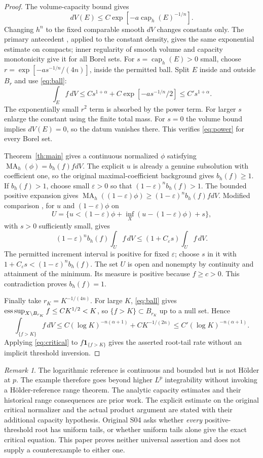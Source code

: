 \documentclass[11pt]{article}
\newcommand{\MA}{\operatorname{MA}}
\newcommand{\capH}{\operatorname{cap}}
\theoremstyle{remark}\newtheorem{remark}[theorem]{Remark}
\begin{document}
\begin{proof}
The volume-capacity bound \cite[Proposition 5.1]{KN} gives
\[
 dV(E)\leq C\exp[-a\capH_h(E)^{-1/n}].
\]
Changing $h^n$ to the fixed comparable smooth $dV$ changes constants
only. The primary antecedent \cite[Corollary 2.4]{DK}, applied to the
constant density, gives the same exponential estimate on compacts;
inner regularity of smooth volume and capacity monotonicity give it
for all Borel sets. For $s=\capH_h(E)>0$ small, choose
$r=\exp[-a s^{-1/n}/(4n)]$, inside the permitted ball.
Split $E$ inside and outside $B_r$ and use \eqref{eq:ball}:
\[
 \int_Ef\,dV\leq C s^{1+\alpha}
                +C\exp[-a s^{-1/n}/2]
          \leq C' s^{1+\alpha}.
\]
The exponentially small $r^2$ term is absorbed by the power term.
For larger $s$ enlarge the constant using the finite total mass.
For $s=0$ the volume bound implies $dV(E)=0$, so the datum vanishes
there. This verifies \eqref{eq:power} for every Borel set.

Theorem~\ref{th:main} gives a continuous normalized $\phi$ satisfying
$\MA_h(\phi)=b_h(f)fdV$. The explicit $u$ is already a genuine
subsolution with coefficient one, so the original maximal-coefficient
background gives $b_h(f)\geq1$. If $b_h(f)>1$, choose small
$\varepsilon>0$ so that $(1-\varepsilon)^n b_h(f)>1$.
The bounded positive expansion gives
$\MA_h((1-\varepsilon)\phi)\geq(1-\varepsilon)^n b_h(f)fdV$.
Modified comparison \cite[Theorem 2.3]{KN}, for $u$ and
$(1-\varepsilon)\phi$ on
\[
 U=\{u<(1-\varepsilon)\phi+
                 \inf_X(u-(1-\varepsilon)\phi)+s\},
\]
with $s>0$ sufficiently small, gives
\[
 (1-\varepsilon)^n b_h(f)\int_U f\,dV
       \leq(1+C_\varepsilon s)\int_U f\,dV.
\]
The permitted increment interval is positive for fixed $\varepsilon$;
choose $s$ in it with $1+C_\varepsilon s<(1-\varepsilon)^n b_h(f)$.
The set $U$ is open and nonempty by continuity and attainment of the
minimum. Its measure is positive because $f\geq c>0$.
This contradiction proves $b_h(f)=1$.

Finally take $r_K=K^{-1/(4n)}$. For large $K$, \eqref{eq:ball}
gives $\mathop{\rm ess\,sup}_{X\setminus B_{r_K}}f\leq C K^{1/2}<K$,
so $\{f>K\}\subset B_{r_K}$ up to a null set. Hence
\[
 \int_{\{f>K\}}f\,dV
    \leq C(\log K)^{-n(\alpha+1)}+CK^{-1/(2n)}
    \leq C'(\log K)^{-n(\alpha+1)}.
\]
Applying \eqref{eq:critical} to $f\mathbf1_{\{f>K\}}$ gives the
asserted root-tail rate without an implicit threshold inversion.
\end{proof}

\begin{remark}
The logarithmic reference is continuous and bounded but is not H\"older
at $p$. The example therefore goes beyond higher $L^p$ integrability
without invoking a H\"older-reference range theorem. The analytic
capacity estimates and their historical range consequences are prior
work. The explicit estimate on the original critical normalizer and the
actual product argument are stated with their additional capacity
hypothesis. Original S04 asks whether \emph{every} positive-threshold
root has uniform tails, or whether uniform tails alone give the exact
critical equation. This paper proves neither universal assertion and
does not supply a counterexample to either one.
\end{remark}
\end{document}
